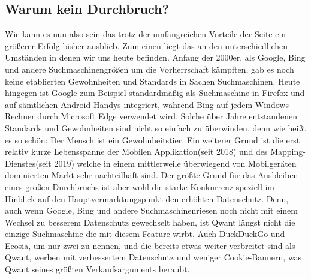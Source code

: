\subsection{Warum kein Durchbruch?}\label{subsec:warum-kein-durchbruch?}
Wie kann es nun also sein das trotz der umfangreichen Vorteile der Seite ein größerer Erfolg bisher ausblieb.
Zum einen liegt das an den unterschiedlichen Umständen in denen wir uns heute befinden.
Anfang der 2000er, als Google, Bing und andere Suchmaschinengrößen um die Vorherrschaft kämpften, gab es noch keine
etablierten Gewohnheiten und Standards in Sachen Suchmaschinen.
Heute hingegen ist Google zum Beispiel standardmäßig als Suchmaschine in Firefox und auf sämtlichen Android Handys
integriert, während Bing auf jedem Windows-Rechner durch Microsoft Edge verwendet wird.
Solche über Jahre entstandenen Standards und Gewohnheiten sind nicht so einfach zu überwinden, denn wie heißt es so
schön: Der Mensch ist ein Gewohnheitstier.
Ein weiterer Grund ist die erst relativ kurze Lebensspanne der Mobilen Applikation(seit 2018) und des Mapping-Dienstes(seit 2019)
welche in einem mittlerweile überwiegend von Mobilgeräten dominierten Markt sehr nachteilhaft sind.
Der größte Grund für das Ausbleiben eines großen Durchbruchs ist aber wohl die starke Konkurrenz speziell im Hinblick auf
den Hauptvermarktungspunkt den erhöhten Datenschutz.
Denn, auch wenn Google, Bing und andere Suchmaschinenriesen noch nicht mit einem Wechsel zu besserem Datenschutz gewechselt
haben, ist Qwant längst nicht die einzige Suchmaschine die mit diesem Feature wirbt.
Auch DuckDuckGo und Ecosia, um nur zwei zu nennen, und die bereits etwas weiter verbreitet sind als Qwant, werben mit
verbessertem Datenschutz und weniger Cookie-Bannern, was Qwant seines größten Verkaufsarguments beraubt.